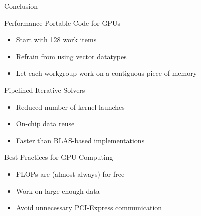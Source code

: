 \begin{frame}{Conclusion}

  \begin{block}{Performance-Portable Code for GPUs}
    \begin{itemize}
     \item Start with 128 work items
     \item Refrain from using vector datatypes
     \item Let each workgroup work on a contiguous piece of memory
    \end{itemize}
  \end{block}

  \begin{block}{Pipelined Iterative Solvers}
    \begin{itemize}
     \item Reduced number of kernel launches
     \item On-chip data reuse
     \item Faster than BLAS-based implementations
    \end{itemize}
  \end{block}

  \begin{block}{Best Practices for GPU Computing}
    \begin{itemize}
      \item FLOPs are (almost always) for free
      \item Work on large enough data
      \item Avoid unnecessary PCI-Express communication
    \end{itemize}
  \end{block}

\end{frame}


